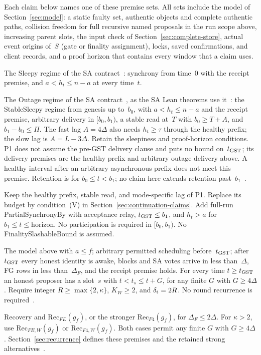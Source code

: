 \documentclass{article}
\theoremstyle{plain}
\theoremstyle{definition}
\theoremstyle{remark}
\newcommand{\SAS}{\cite{SAS}}
\begin{document}
Each claim below names one of these premise sets.  All sets include
the model of Section~\ref{sec:model}: a static faulty set, authentic
objects and complete authentic paths, collision freedom for full recursive named proposals in the run scope above, increasing
parent slots, the input check of Section~\ref{sec:complete-store},
actual event origins of~$S$ (gate or finality assignment), locks,
saved confirmations, and client records,
and a proof horizon that contains every window that a claim uses.
\begin{description}[leftmargin=1.5em]
\item[Clean.]  The Sleepy regime of the SA contract~\cite[\S4]{ACC}:
  synchrony from time~$0$ with the receipt premise, and
  $a<h_t\leq n-a$ at every time~$t$.
\item[P1.]  The Outage regime of the SA contract~\cite[\S4]{ACC}, as the
  SA Lean theorems use it~\SAS: the StableSleepy regime from genesis
  up to~$b_0$, with $a<h_t\leq n-a$ and the receipt premise,
  arbitrary delivery in $[b_0,b_1)$, a stable read at~$T$ with
  $b_0\geq T+A$, and $b_1-b_0\leq\Pi$.  The fast lag $A=4\Delta$ also
  needs $h_t\geq\tau$ through the healthy prefix; the slow lag is
  $A=L-3\Delta$.  Retain the sleepiness and proof-horizon conditions.
  P1 does not assume the pre-GST delivery clause and puts no bound on~$t_{\rm GST}$; its delivery
  premises are the healthy prefix and arbitrary outage delivery above.
  A healthy interval after an arbitrary asynchronous prefix does not
  meet this premise.  Retention is for $b_0\leq t<b_1$; no claim here
  extends retention past~$b_1$~\cite[\S4.3]{FB}.
\item[Outage continuation.]  Keep the healthy prefix, stable read, and
  mode-specific lag of P1.  Replace its budget by condition~(V) in
  Section~\ref{sec:continuation-claims}.  Add full-run
  \textsf{PartialSynchronyBy} with acceptance relay,
  $t_{\rm GST}\leq b_1$, and $h_t>a$ for
  $b_1\leq t\leq\mathrm{horizon}$.  No participation is required in
  $[b_0,b_1)$.  No \textsf{FinalitySlashableBound} is assumed.
\item[Recovery.]  The model above with $a\leq f$; arbitrary permitted
  scheduling before~$t_{\rm GST}$; after $t_{\rm GST}$ every honest
  identity is awake, blocks and SA votes arrive in less than~$\Delta$,
  FG rows in less than~$\Delta_F$, and the receipt premise holds.
  For every time $t\geq t_{\rm GST}$ an honest proposer
  has a slot~$s$ with $t<t_s\leq t+G$, for any finite $G$ with $G\geq4\Delta$.  Require
  integer $R\geq\max\{2,\kappa\}$, $K_W\geq2$, and $\delta_{\rm t}=2R$.
  No round recurrence is required~\cite[H.20--H.22]{BPH}.
\item[First finality.]  Recovery and $\mathrm{Rec}_{FE}(g_f)$, or
  the stronger $\mathrm{Rec}_{F4}(g_f)$, for $\Delta_F\leq2\Delta$.
  For $\kappa>2$, use $\mathrm{Rec}_{FE,W}(g_f)$ or
  $\mathrm{Rec}_{F4,W}(g_f)$.  Both cases permit any finite $G$ with $G\geq4\Delta$.
  Section~\ref{sec:recurrence} defines these premises and the
  retained strong alternatives~\cite[FF5, FF5-S]{BPF}.
\end{description}
\end{document}
